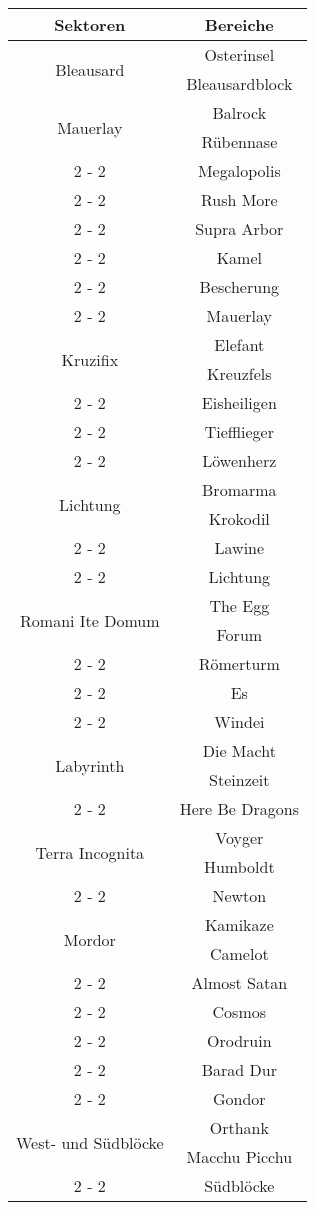 \documentclass{article}%
\begin{document}
\begin{tabular}{|c|c|}%
\hline%
Sektoren&Bereiche\\%
\hline%
\multirow{2}{*}{Bleausard}&Osterinsel\\%
\cline{2%
-%
2}%
&Bleausardblock\\%
\hline%
\multirow{2}{*}{Mauerlay}&Balrock\\%
\cline{2%
-%
2}%
&Rübennase\\%
\cline{2%
-%
2}%
&Megalopolis\\%
\cline{2%
-%
2}%
&Rush More\\%
\cline{2%
-%
2}%
&Supra Arbor\\%
\cline{2%
-%
2}%
&Kamel\\%
\cline{2%
-%
2}%
&Bescherung\\%
\cline{2%
-%
2}%
&Mauerlay\\%
\hline%
\multirow{2}{*}{Kruzifix}&Elefant\\%
\cline{2%
-%
2}%
&Kreuzfels\\%
\cline{2%
-%
2}%
&Eisheiligen\\%
\cline{2%
-%
2}%
&Tiefflieger\\%
\cline{2%
-%
2}%
&Löwenherz\\%
\hline%
\multirow{2}{*}{Lichtung}&Bromarma\\%
\cline{2%
-%
2}%
&Krokodil\\%
\cline{2%
-%
2}%
&Lawine\\%
\cline{2%
-%
2}%
&Lichtung\\%
\hline%
\multirow{2}{*}{Romani Ite Domum}&The Egg\\%
\cline{2%
-%
2}%
&Forum\\%
\cline{2%
-%
2}%
&Römerturm\\%
\cline{2%
-%
2}%
&Es\\%
\cline{2%
-%
2}%
&Windei\\%
\hline%
\multirow{2}{*}{Labyrinth}&Die Macht\\%
\cline{2%
-%
2}%
&Steinzeit\\%
\cline{2%
-%
2}%
&Here Be Dragons\\%
\hline%
\multirow{2}{*}{Terra Incognita}&Voyger\\%
\cline{2%
-%
2}%
&Humboldt\\%
\cline{2%
-%
2}%
&Newton\\%
\hline%
\multirow{2}{*}{Mordor}&Kamikaze\\%
\cline{2%
-%
2}%
&Camelot\\%
\cline{2%
-%
2}%
&Almost Satan\\%
\cline{2%
-%
2}%
&Cosmos\\%
\cline{2%
-%
2}%
&Orodruin\\%
\cline{2%
-%
2}%
&Barad Dur\\%
\cline{2%
-%
2}%
&Gondor\\%
\hline%
\multirow{2}{*}{West{-} und Südblöcke}&Orthank\\%
\cline{2%
-%
2}%
&Macchu Picchu\\%
\cline{2%
-%
2}%
&Südblöcke\\%
\hline%
\end{tabular}

%
\end{document}
